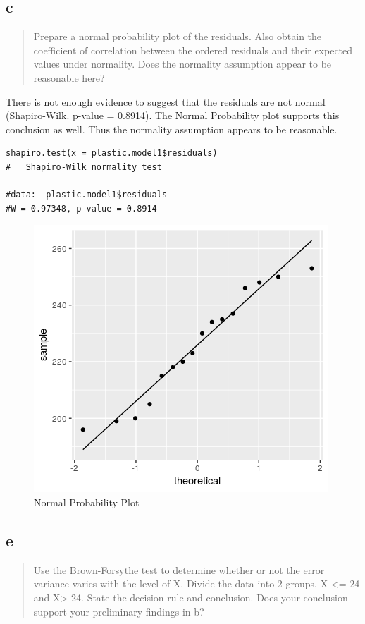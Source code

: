 \documentclass[11pt]{article}
\begin{document}
\subsection{c}
\label{sec:org9dccc42}
\begin{quote}
Prepare a normal probability plot of the residuals. Also obtain the coefficient
of correlation between the ordered residuals and their expected values under
normality. Does the normality assumption appear to be reasonable here?
\end{quote}

There is not enough evidence to suggest that the residuals are not normal
(Shapiro-Wilk. p-value = 0.8914). The Normal Probability plot supports this
conclusion as well. Thus the normality assumption appears to be reasonable.

\begin{verbatim}
shapiro.test(x = plastic.model1$residuals)
#	Shapiro-Wilk normality test

#data:  plastic.model1$residuals
#W = 0.97348, p-value = 0.8914
\end{verbatim}

\begin{figure}[htbp]
\centering
\includegraphics[width=.9\linewidth]{./images/3.6c.png}
\caption{\label{fig:org12ef483}
Normal Probability Plot}
\end{figure}

\subsection{e}
\label{sec:orga3e89e3}
\begin{quote}
Use the Brown-Forsythe test to determine whether or not the error variance
varies with the level of X. Divide the data into 2 groups, X <= 24 and X> 24.
State the decision rule and conclusion. Does your conclusion support your
preliminary findings in b?
\end{quote}
\end{document}
